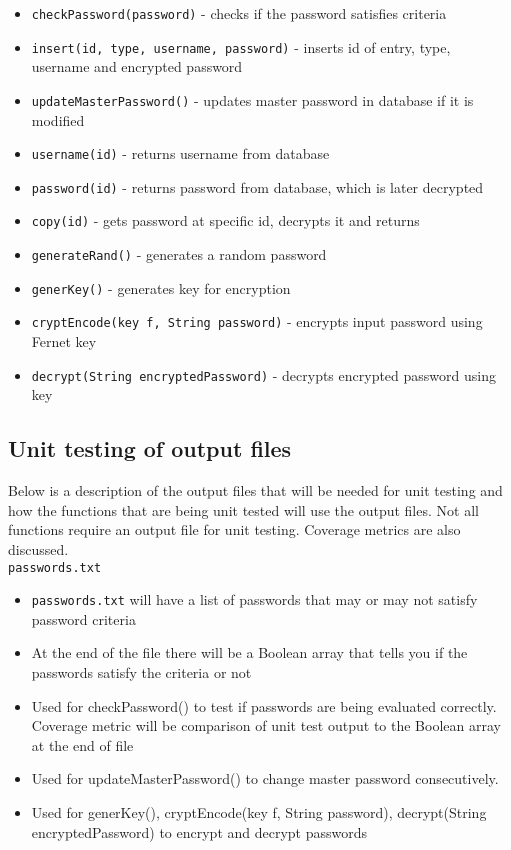 \documentclass[12pt, titlepage]{article}
\begin{document}
\begin{itemize}
    \item \texttt{checkPassword(password)} - checks if the password satisfies criteria
    \item \texttt{insert(id, type, username, password)} - inserts id of entry, type, username and encrypted password
    \item \texttt{updateMasterPassword()} - updates master password in database if it is modified    
    \item \texttt{username(id)} - returns username from database
    
    \item \texttt{password(id)} - returns password from database, which is later decrypted
    \item \texttt{copy(id)} - gets password at specific id, decrypts it and returns
    \item \texttt{generateRand()} - generates a random password
    \item \texttt{generKey()} - generates key for encryption
    \item \texttt{cryptEncode(key f, String password)} - encrypts input password using Fernet key
    \item \texttt{decrypt(String encryptedPassword)} - decrypts encrypted password using key
\end{itemize}

\subsection{Unit testing of output files}		

Below is a description of the output files that will be needed for unit testing and how the functions that are being unit tested will use the output files. Not all functions require an output file for unit testing. Coverage metrics are also discussed.\\

\texttt{passwords.txt}
\begin{itemize}
    \item \texttt{passwords.txt} will have a list of passwords that may or may not satisfy password criteria 
    \item At the end of the file there will be a Boolean array that tells you if the passwords satisfy the criteria or not
    \item Used for checkPassword() to test if passwords are being evaluated correctly. Coverage metric will be comparison of unit test output to the Boolean array at the end of file
    \item Used for updateMasterPassword() to change master password consecutively.
    \item Used for generKey(), cryptEncode(key f, String password), decrypt(String encryptedPassword) to encrypt and decrypt passwords
\end{itemize}
\end{document}
